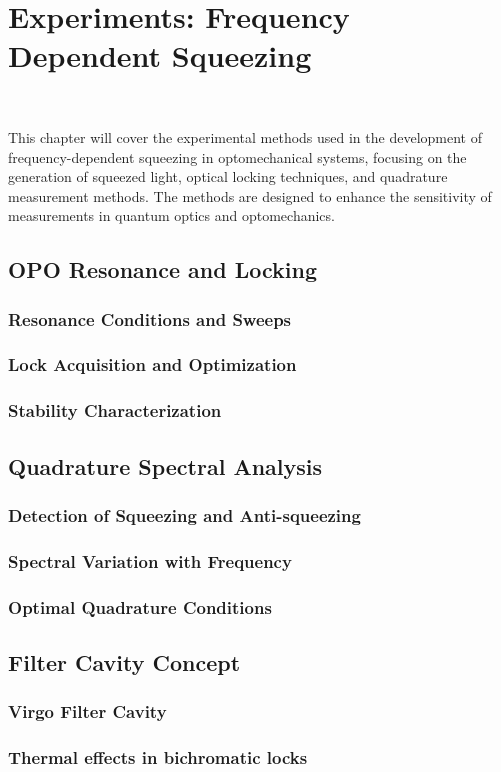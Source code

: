 \chapter{Experiments: Frequency Dependent Squeezing}
\minitoc\

This chapter will cover the experimental methods used in the development of frequency-dependent squeezing in optomechanical systems, focusing on the generation of squeezed light, optical locking techniques, and quadrature measurement methods. The methods are designed to enhance the sensitivity of measurements in quantum optics and optomechanics.
\section{OPO Resonance and Locking}
\subsection{Resonance Conditions and Sweeps}
\subsection{Lock Acquisition and Optimization}
\subsection{Stability Characterization}
\section{Quadrature Spectral Analysis}
\subsection{Detection of Squeezing and Anti-squeezing}
\subsection{Spectral Variation with Frequency}
\subsection{Optimal Quadrature Conditions}
\section{Filter Cavity Concept}
\subsection{Virgo Filter Cavity }
\subsection{Thermal effects in bichromatic locks}